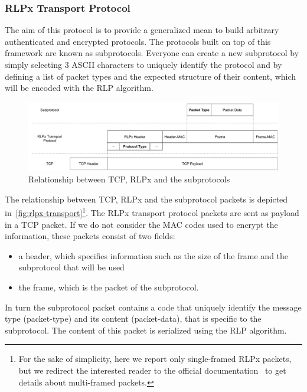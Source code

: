 \subsubsection{RLPx Transport Protocol}
\label{sec:rlpx-transport-protocol}

The aim of this protocol is to provide a generalized mean to build arbitrary
authenticated and encrypted protocols. The protocols built on top of this
framework are known as subprotocols. Everyone can create a new subprotocol by
simply selecting $3$ ASCII characters to uniquely identify the protocol and by
defining a list of packet types and the expected structure of their content,
which will be encoded with the RLP algorithm.

\begin{figure}
  \begin{center}
    \includegraphics[width=\textwidth]{./res/img/rlpx-transport}
    \caption{Relationship between TCP, RLPx and the subprotocols}
    \label{fig:rlpx-transport}
  \end{center}
\end{figure}

The relationship between TCP, RLPx and the subprotocol packets is depicted
in~\autoref{fig:rlpx-transport}\footnote{For the sake of simplicity, here we
report only single-framed RLPx packets, but we redirect the interested reader to
the official documentation~\cite{rlpx} to get details about multi-framed
packets.}. The RLPx transport protocol packets are sent as payload in a TCP
packet. If we do not consider the MAC codes used to encrypt the information,
these packets consist of two fields:
\begin{itemize}
  \item a header, which specifies information such as the size of the frame and
  the subprotocol that will be used
  \item the frame, which is the packet of the subprotocol.
\end{itemize}

In turn the subprotocol packet contains a code that uniquely identify the
message type (packet-type) and its content (packet-data), that is specific to
the subprotocol. The content of this packet is serialized using the RLP
algorithm.

